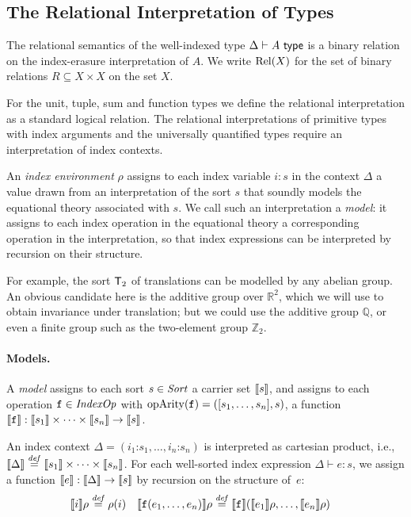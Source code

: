 \subsection{The Relational Interpretation of Types}
\label{sec:relational-semantics}

The relational semantics of the well-indexed type
$\Delta \vdash A \textup{\textsf{ type}}$ is a binary relation on the index-erasure
interpretation of $A$. We write $\mathrm{Rel}(X)$ for the set
of binary relations $R \subseteq X \times X$ on the set $X$.

For the unit, tuple, sum and function types we define the
relational interpretation as a standard logical relation. The
relational interpretations of primitive types with index arguments and
the universally quantified types require an interpretation of index
contexts.

An \emph{index environment} $\rho$ assigns to each index variable $i:s$
in the context $\Delta$ a value drawn from an interpretation of
the sort $s$ that soundly models the equational theory associated with $s$. We call
such an interpretation a \emph{model}: it assigns to each index operation in the equational 
theory a corresponding operation in the interpretation, so that index expressions 
can be interpreted by recursion on their structure. 

For example, the sort $\mathsf{T}_2$ of translations can be modelled by
any abelian group. An obvious candidate here is the additive group over 
$\mathbb R^2$, which we will use to obtain invariance under translation;
but we could use the additive group $\mathbb Q$, or even a finite group such as the 
two-element group $\mathbb Z_2$. 

\paragraph{Models.}
A \emph{model} 
assigns to each sort $s \in \mathit{Sort}$ a
carrier set $\llbracket s \rrbracket$, and assigns to each operation $\texttt{f}
\in \mathit{IndexOp}$ with $\mathrm{opArity}(\texttt{f}) =
([s_1,\ldots,s_n],s)$, a function $\llbracket \texttt{f} \rrbracket :
\llbracket s_1 \rrbracket\times\cdots\times\llbracket s_n \rrbracket \to \llbracket s \rrbracket$.

An index context $\Delta = (i_1\mathord:s_1,\ldots,i_n\mathord:s_n)$ is
interpreted as cartesian product, i.e., $\llbracket \Delta \rrbracket \stackrel{\mathit{def}}= \llbracket s_1 \rrbracket
\times\cdots \times \llbracket s_n \rrbracket$. 
For each well-sorted index expression $\Delta \vdash
e : s$, we assign a function $\llbracket e \rrbracket : \llbracket \Delta \rrbracket \to
\llbracket s \rrbracket$ by recursion on the structure of~$e$:
\begin{align*}
\llbracket i \rrbracket \rho & \stackrel{\mathit{def}}= \rho(i) &
\llbracket \textup{\texttt{f}}(e_1, \ldots, e_n) \rrbracket \rho & \stackrel{\mathit{def}}= \llbracket \textup{\texttt{f}} \rrbracket(
\llbracket e_1 \rrbracket\rho,\ldots,\llbracket e_n \rrbracket\rho)
\end{align*}

